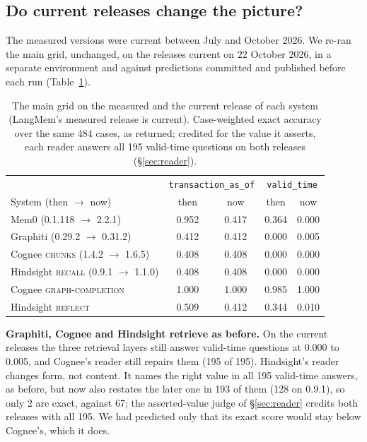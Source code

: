 \documentclass[conference]{IEEEtran}
\begin{document}
\subsection{Do current releases change the picture?}\label{sec:releases}

The measured versions were current between July and October 2026. We re-ran
the main grid, unchanged, on the releases current on 22 October 2026, in a
separate environment and against predictions committed and published before
each run (Table~\ref{tab:releases}).

\begin{table}[t]
\centering
\caption{The main grid on the measured and the current release of each system
(LangMem's measured release is current). Case-weighted exact accuracy over the
same 484 cases, as returned; credited for the value it asserts, each reader
answers all 195 valid-time questions on both releases (\textup{\S}\ref{sec:reader}).}
\label{tab:releases}
\footnotesize
\setlength{\tabcolsep}{3pt}
\begin{tabular}{@{}lcccc@{}}
\toprule
& \multicolumn{2}{c}{\scriptsize\texttt{transaction\_as\_of}} & \multicolumn{2}{c}{\scriptsize\texttt{valid\_time}} \\
System (then $\to$ now) & then & now & then & now \\
\midrule
Mem0 (0.1.118 $\to$ 2.2.1)               & 0.952 & 0.417 & 0.364 & 0.000 \\
Graphiti (0.29.2 $\to$ 0.31.2)           & 0.412 & 0.412 & 0.000 & 0.005 \\
Cognee \textsc{chunks} (1.4.2 $\to$ 1.6.5) & 0.408 & 0.408 & 0.000 & 0.000 \\
Hindsight \textsc{recall} (0.9.1 $\to$ 1.1.0) & 0.408 & 0.408 & 0.000 & 0.000 \\
\midrule
Cognee \textsc{graph-completion}         & 1.000 & 1.000 & 0.985 & 1.000 \\
Hindsight \textsc{reflect}               & 0.509 & 0.412 & 0.344 & 0.010 \\
\bottomrule
\end{tabular}
\end{table}

\textbf{Graphiti, Cognee and Hindsight retrieve as before.} On the current
releases the three retrieval layers still answer valid-time questions at 0.000
to 0.005, and Cognee's reader still repairs them (195 of 195). Hindsight's
reader changes form, not content. It names the right value in all 195
valid-time answers, as before, but now also restates the later one in 193 of
them (128 on 0.9.1), so only 2 are exact, against 67; the asserted-value judge of
\S\ref{sec:reader} credits both releases with all 195. We had predicted only that
its exact score would stay below Cognee's, which it does.
\end{document}
